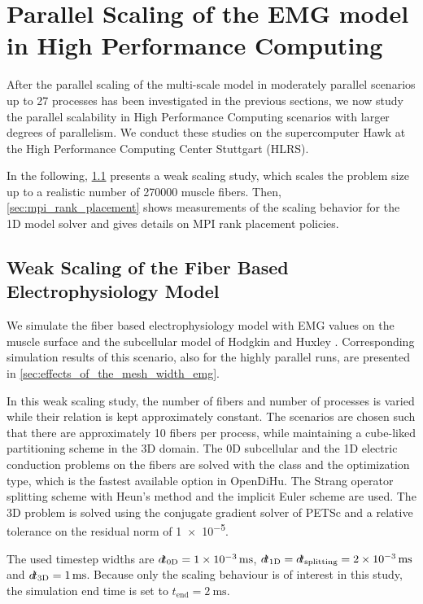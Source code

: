 
\section{Parallel Scaling of the EMG model in High Performance Computing}

After the parallel scaling of the multi-scale model in moderately parallel scenarios up to 27 processes has been investigated in the previous sections, we now study the parallel scalability in High Performance Computing scenarios with larger degrees of parallelism.
We conduct these studies on the supercomputer Hawk at the High Performance Computing Center Stuttgart (HLRS). 

In the following, \cref{sec:weak_scaling_hawk} presents a weak scaling study, which scales the problem size up to a realistic number of \num{270000} muscle fibers.
Then, \cref{sec:mpi_rank_placement} shows measurements of the scaling behavior for the 1D model solver and gives details on MPI rank placement policies.

\subsection{Weak Scaling of the Fiber Based Electrophysiology Model}\label{sec:weak_scaling_hawk}

We simulate the fiber based electrophysiology model with EMG values on the muscle surface and the subcellular model of Hodgkin and Huxley \cite{Hodgkin1952}.
Corresponding simulation results of this scenario, also for the highly parallel runs, are presented in \cref{sec:effects_of_the_mesh_width_emg}.

In this weak scaling study, the number of fibers and number of processes is varied while their relation is kept approximately constant. The scenarios are chosen such that there are approximately 10 fibers per process, while maintaining a cube-liked partitioning scheme in the 3D domain. The 0D subcellular and the 1D electric conduction problems on the fibers are solved with the  class and the  optimization type, which is the fastest available option in OpenDiHu. The Strang operator splitting scheme with Heun's method and the implicit Euler scheme are used. The 3D problem is solved using the conjugate gradient solver of PETSc and a relative tolerance on the residual norm of \num{1e-5}. 

The used timestep widths are $\dt_\text{0D}=\SI{1e-3}{\milli\second}$, $\dt_\text{1D}=\dt_\text{splitting}=\SI{2e-3}{\milli\second}$ and $\dt_\text{3D}=\SI{1}{\milli\second}$. Because only the scaling behaviour is of interest in this study, the simulation end time is set to $t_\text{end}=\SI{2}{\milli\second}$.


